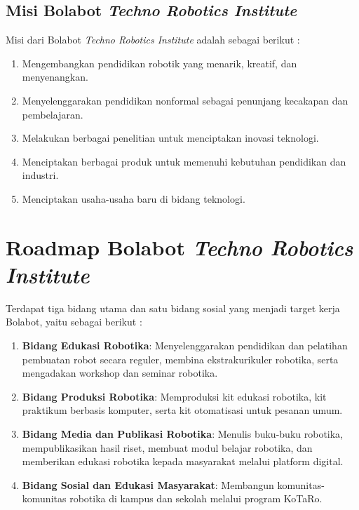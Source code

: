 \subsection{Misi Bolabot \textit{Techno Robotics Institute}}
Misi dari Bolabot \textit{Techno Robotics Institute} adalah sebagai berikut \cite{6}:
\begin{enumerate}
    \item Mengembangkan pendidikan robotik yang menarik, kreatif, dan menyenangkan.
    \item Menyelenggarakan pendidikan nonformal sebagai penunjang kecakapan dan pembelajaran.
    \item Melakukan berbagai penelitian untuk menciptakan inovasi teknologi.
    \item Menciptakan berbagai produk untuk memenuhi kebutuhan pendidikan dan industri.
    \item Menciptakan usaha-usaha baru di bidang teknologi.
\end{enumerate}


\section{Roadmap Bolabot \textit{Techno Robotics Institute}}

Terdapat tiga bidang utama dan satu bidang sosial yang menjadi target kerja Bolabot, yaitu sebagai berikut \cite{15}:

\begin{enumerate}
    \item \textbf{Bidang Edukasi Robotika}: Menyelenggarakan pendidikan dan pelatihan pembuatan robot secara reguler, membina ekstrakurikuler robotika, serta mengadakan workshop dan seminar robotika.
    \item \textbf{Bidang Produksi Robotika}: Memproduksi kit edukasi robotika, kit praktikum berbasis komputer, serta kit otomatisasi untuk pesanan umum.
    \item \textbf{Bidang Media dan Publikasi Robotika}: Menulis buku-buku robotika, mempublikasikan hasil riset, membuat modul belajar robotika, dan memberikan edukasi robotika kepada masyarakat melalui platform digital.
    \item \textbf{Bidang Sosial dan Edukasi Masyarakat}: Membangun komunitas-komunitas robotika di kampus dan sekolah melalui program KoTaRo.
\end{enumerate}
